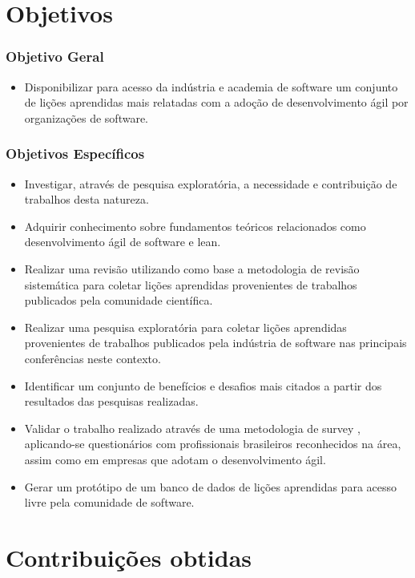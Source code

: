 \section{Objetivos} 

\subsubsection{Objetivo Geral}

\begin{itemize}
	\item Disponibilizar para acesso da indústria e academia de software um conjunto de lições aprendidas mais relatadas com a adoção de desenvolvimento ágil por organizações de software.
\end{itemize}

\subsubsection{Objetivos Específicos}

\begin{itemize}
	\item Investigar, através de pesquisa exploratória, a necessidade e contribuição de trabalhos desta natureza.
	\item Adquirir conhecimento sobre fundamentos teóricos relacionados como desenvolvimento ágil de software e lean.
	\item Realizar uma revisão utilizando como base a metodologia de revisão sistemática \cite{Barbara04} para coletar lições aprendidas provenientes de trabalhos publicados pela comunidade científica.
	\item Realizar uma pesquisa exploratória para coletar lições aprendidas provenientes de trabalhos publicados pela indústria de software nas principais conferências neste contexto.
	\item Identificar um conjunto de benefícios e desafios mais citados a partir dos resultados das pesquisas realizadas.
	\item Validar o trabalho realizado através de uma metodologia de survey \cite{Babbie1990}, aplicando-se questionários com profissionais brasileiros reconhecidos na área, assim como em empresas que adotam o desenvolvimento ágil.
	\item Gerar um protótipo de um banco de dados de lições aprendidas para acesso livre pela comunidade de software.
\end{itemize}

\section{Contribuições obtidas}

